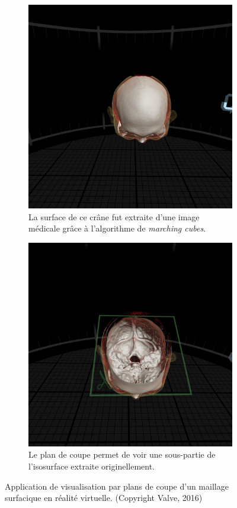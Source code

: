 {{{            \begin{figure}[h]
                \centering
                \begin{subfigure}{.45\linewidth}
                    \centering
                    \includegraphics[width=.8\linewidth]{img/vrview_1.jpg}
                    \captionsetup{width=.8\linewidth}
                    \caption{La surface de ce crâne fut extraite d'une image médicale grâce à l'algorithme de \textit{marching cubes}.}
                    \label{img:vr_slicer:original}
                \end{subfigure}
                \centering
                \begin{subfigure}{.45\linewidth}
                    \centering
                    \includegraphics[width=.8\linewidth]{img/vrview_2.jpg}
                    \captionsetup{width=.8\linewidth}
                    \caption{Le plan de coupe permet de voir une sous-partie de l'isosurface extraite originellement.}
                    \label{img:vr_slicer:sliced}
                \end{subfigure}
                \caption{Application de visualisation par plans de coupe d'un maillage surfacique en réalité virtuelle. (Copyright Valve, 2016)}
                \label{img:vr_slicer}
            \end{figure}

}}}
